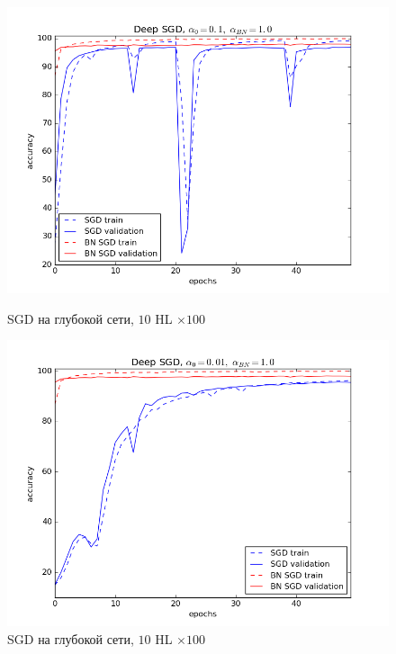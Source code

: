 \documentclass[12pt,oneside]{article}
\begin{document}
\begin{figure}[h!]
\centering
\begin{minipage}{0.45\textwidth}
\includegraphics[scale=0.45]{images/mnistDeepSGD1.png}
\caption{\small SGD на глубокой сети, $10$ HL $\times 100$}
\end{minipage} \hfill
\begin{minipage}{0.45\textwidth}
\includegraphics[scale=0.45]{images/mnistDeepSGD2.png}
\caption{\small SGD на глубокой сети, $10$ HL $\times 100$}
\end{minipage} \vfill
\begin{minipage}{0.45\textwidth}

\end{minipage}
\end{figure}
\end{document}
